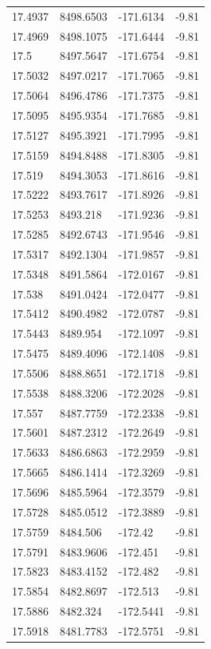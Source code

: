 \begin{table}[H]
\begin{tabular}{llll}
17.4937 & 8498.6503 & -171.6134 & -9.81 \\
17.4969 & 8498.1075 & -171.6444 & -9.81 \\
17.5 & 8497.5647 & -171.6754 & -9.81 \\
17.5032 & 8497.0217 & -171.7065 & -9.81 \\
17.5064 & 8496.4786 & -171.7375 & -9.81 \\
17.5095 & 8495.9354 & -171.7685 & -9.81 \\
17.5127 & 8495.3921 & -171.7995 & -9.81 \\
17.5159 & 8494.8488 & -171.8305 & -9.81 \\
17.519 & 8494.3053 & -171.8616 & -9.81 \\
17.5222 & 8493.7617 & -171.8926 & -9.81 \\
17.5253 & 8493.218 & -171.9236 & -9.81 \\
17.5285 & 8492.6743 & -171.9546 & -9.81 \\
17.5317 & 8492.1304 & -171.9857 & -9.81 \\
17.5348 & 8491.5864 & -172.0167 & -9.81 \\
17.538 & 8491.0424 & -172.0477 & -9.81 \\
17.5412 & 8490.4982 & -172.0787 & -9.81 \\
17.5443 & 8489.954 & -172.1097 & -9.81 \\
17.5475 & 8489.4096 & -172.1408 & -9.81 \\
17.5506 & 8488.8651 & -172.1718 & -9.81 \\
17.5538 & 8488.3206 & -172.2028 & -9.81 \\
17.557 & 8487.7759 & -172.2338 & -9.81 \\
17.5601 & 8487.2312 & -172.2649 & -9.81 \\
17.5633 & 8486.6863 & -172.2959 & -9.81 \\
17.5665 & 8486.1414 & -172.3269 & -9.81 \\
17.5696 & 8485.5964 & -172.3579 & -9.81 \\
17.5728 & 8485.0512 & -172.3889 & -9.81 \\
17.5759 & 8484.506 & -172.42 & -9.81 \\
17.5791 & 8483.9606 & -172.451 & -9.81 \\
17.5823 & 8483.4152 & -172.482 & -9.81 \\
17.5854 & 8482.8697 & -172.513 & -9.81 \\
17.5886 & 8482.324 & -172.5441 & -9.81 \\
17.5918 & 8481.7783 & -172.5751 & -9.81 \\

\end{tabular}
\end{table}
